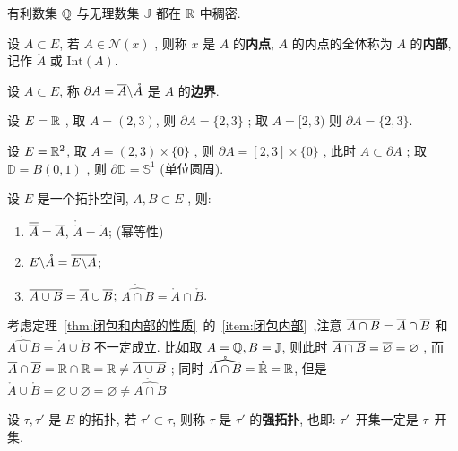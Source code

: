  \begin{Ex}
      有利数集 $ \Q $ 与无理数集 $ \mathbb{J} $ 都在 $ \R $ 中稠密. 
 \end{Ex}
 \begin{Def}[内部]\label{def:内部}
       设 $ A\subset E $, 若 $ A\in\mathcal{N}(x) $ , 则称 $ x $ 是 $ A $ 的\textbf{内点},  $ A $ 的内点的全体称为 $ A $ 的\textbf{内部}, 记作 $ \mathring{A} $ 或 $ \mathrm{Int}(A) $.  
 \end{Def}
 \begin{Def}[边界]\label{def:边界}
       设 $ A\subset E $, 称 $ \partial A = \baro{A}\bs\mathring{A} $ 是 $ A $ 的\textbf{边界}.
 \end{Def}
 \begin{Ex}
      设 $ E=\R $ , 取 $ A = (2, 3) $, 则 $ \partial A = \{ 2, 3 \} $ ; 取 $ A = [2, 3) $ 则 $ \partial A = \{ 2, 3 \} $. 
      
      设 $ E = \R^{2} $, 取 $ A = (2, 3)\times \{0\} $ , 则 $ \partial A = [2, 3]\times \{0\} $ , 此时 $ A\subset \partial A $  ; 取 $ \mathbb{D}=B(0, 1) $ , 则 $ \partial \mathbb{D}=\mathbb{S}^{1} $ (单位圆周). 
 \end{Ex}
 \begin{Thm}\label{thm:闭包和内部的性质}
       设 $ E $ 是一个拓扑空间, $ A, B\subset E $ , 则:
       \begin{enumerate}[(1)]
            \item $ \baro{\baro{A}}=\baro{A} $, $ \mathring{\mathring{A}}=\mathring{A} $; (幂等性)
            \item $ E\bs\mathring{A}=\overline{E\bs A} $;
            \item \label{item:闭包内部}$ \overline {A\cup B}=\baro{A}\cup \baro{B} $; $ \mathring{\widehat{A\cap B}}=\mathring{A}\cap\mathring{B} $.   
       \end{enumerate}
 \end{Thm}
 \begin{Rmk}
      考虑定理~\ref{thm:闭包和内部的性质}~的~\ref{item:闭包内部}~,注意 $ \overline {A\cap B}=\baro{A}\cap \baro{B} $ 和 $ \mathring{\widehat{A\cup B}}=\mathring{A}\cup\mathring{B} $ 不一定成立. 比如取 $ A=\Q, B=\mathbb{J} $, 则此时 $ \overline{A\cap B}=\baro{\varnothing}=\varnothing $  , 而 $ \baro{A}\cap \baro{B}=\R\cap\R=\R\neq\overline {A\cup B} $ ; 同时 $ \mathring{\widehat{A\cap B}}=\mathring{\R}=\R $, 但是 $ \mathring{A}\cup\mathring{B}=\varnothing\cup\varnothing=\varnothing\neq \mathring{\widehat{A\cap B}} $  
 \end{Rmk}
 \begin{Def}[拓扑比较]\label{def:拓扑比较}
       设 $ \tau, \tau' $ 是 $ E $ 的拓扑, 若 $ \tau'\subset\tau $, 则称 $ \tau $ 是 $ \tau' $ 的\textbf{强拓扑}, 也即: $ \tau' $--开集一定是 $ \tau $--开集.   
 \end{Def}
